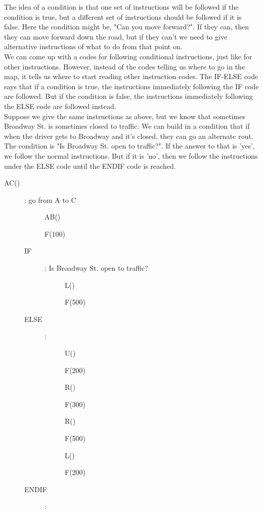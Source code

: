 The idea of a condition is that one set of instructions will be followed if the condition is true, but a different set of instructions should be followed if it is false. Here the condition might be, "Can you move forward?". If they can, then they can move forward down the road, but if they can't we need to give alternative instructions of what to do from that point on.\\

We can come up with a codes for following conditional instructions, just like for other instructions. However, instead of the codes telling us where to go in the map, it tells us where to start reading other instruction codes. The IF-ELSE code says that if a condition is true, the instructions immediately following the IF code are followed. But if the condition is false, the instructions immediately following the ELSE code are followed instead.\\

Suppose we give the same instructions as above, but we know that sometimes Broadway St. is sometimes closed to traffic. We can build in a condition that if when the driver gets to Broadway and it's closed, they can go an alternate rout. The condition is "Is Broadway St. open to traffic?". If the answer to that is 'yes', we follow the normal instructions. But if it is 'no', then we follow the instructions under the ELSE code until the ENDIF code is reached. \\

\begin{description}
	\item[AC()] : go from A to C
	\begin{description}
		\item[] AB()
		\item[] F(100)
		\item[IF]: Is Broadway St. open to traffic?
		\begin{description}
			\item[] L()
			\item[] F(500)
		\end{description}
		\item[ELSE]:
		\begin{description}
			\item[] U()
			\item[] F(200)
			\item[] R()
			\item[] F(300)
			\item[] R()
			\item[] F(500)
			\item[] L()
			\item[] F(200)
		\end{description}
		\item[ENDIF]:
	\end{description}
\end{description}

